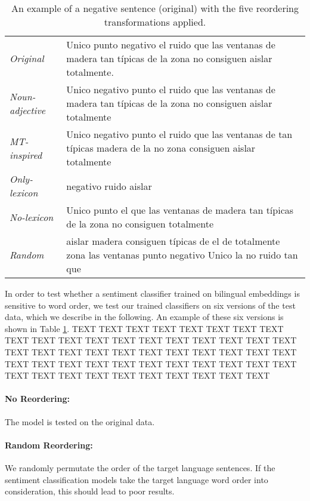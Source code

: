 \documentclass[11pt,a4paper]{article}
\newcommand{\negbox}[1]{{\setlength{\fboxsep}{1pt}\colorbox{lightred}{#1}}}
\begin{document}
\begin{table*}[]
\centering\small
\begin{tabular}{ll}
\toprule
\emph{Original} & Unico punto \negbox{negativo} el \negbox{ruido} que las ventanas de madera tan típicas de la zona \negbox{no consiguen} aislar totalmente. \\[3pt]
\emph{Noun-adjective} & Unico \negbox{negativo} punto el \negbox{ruido} que las ventanas de madera tan típicas de la zona \negbox{no consiguen} aislar totalmente \\[3pt]
\emph{MT-inspired} & Unico \negbox{negativo} punto el \negbox{ruido} que las ventanas de tan típicas madera de la \negbox{no} zona \negbox{consiguen} aislar totalmente \\[3pt]
\emph{Only-lexicon} & \negbox{negativo} \negbox{ruido} aislar \\[3pt]
\emph{No-lexicon} & Unico punto el que las ventanas de madera tan típicas de la zona \negbox{no consiguen} totalmente \\[3pt]
\emph{Random} & aislar madera consiguen típicas de el de totalmente zona las ventanas punto \negbox{negativo} Unico la \negbox{no} \negbox{ruido} tan que\\[3pt]
\bottomrule
\end{tabular}
\caption{An example of a negative sentence (original) with the five reordering
transformations applied.}
\label{example}

\end{table*}

In order to test whether a sentiment classifier trained on bilingual embeddings is sensitive to word order, we test our trained classifiers on six versions of the test
data, which we describe in the following. An example of these six versions is shown in Table \ref{example}. TEXT TEXT TEXT TEXT TEXT TEXT TEXT TEXT TEXT TEXT TEXT TEXT TEXT TEXT TEXT TEXT TEXT TEXT TEXT TEXT TEXT TEXT TEXT TEXT TEXT TEXT TEXT TEXT TEXT TEXT TEXT TEXT TEXT TEXT TEXT TEXT TEXT TEXT TEXT TEXT TEXT TEXT TEXT TEXT TEXT TEXT TEXT TEXT TEXT TEXT TEXT 

\paragraph{No Reordering: }The model is tested on the original data.

\paragraph{Random Reordering: }We randomly permutate the order of the target language sentences. If the sentiment classification models take the target language word order into consideration, this should lead to poor results.
\end{document}
